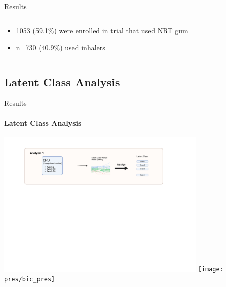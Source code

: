 \documentclass[aspectratio=169]{beamer}
\begin{document}
\begin{frame}{Results}
\begin{columns}
				
				\begin{center}
					\begin{minipage}{\columnwidth}
						\begin{itemize}
							\raggedright
							\tiny
							\item 	1053 (59.1\%) were enrolled in trial that used NRT gum
							\item 	n=730 (40.9\%) used inhalers
						\end{itemize}
					\end{minipage}
				\end{center}



		


	\end{columns}

\end{frame}



\subsection{Latent Class Analysis}
\begin{frame}{Results}
	\framesubtitle{Latent Class Analysis}
	\includegraphics[width=0.75\textwidth]{overview1}
	\centering
	\texttt{[image: pres/bic\_pres]}
\end{frame}
\end{document}
